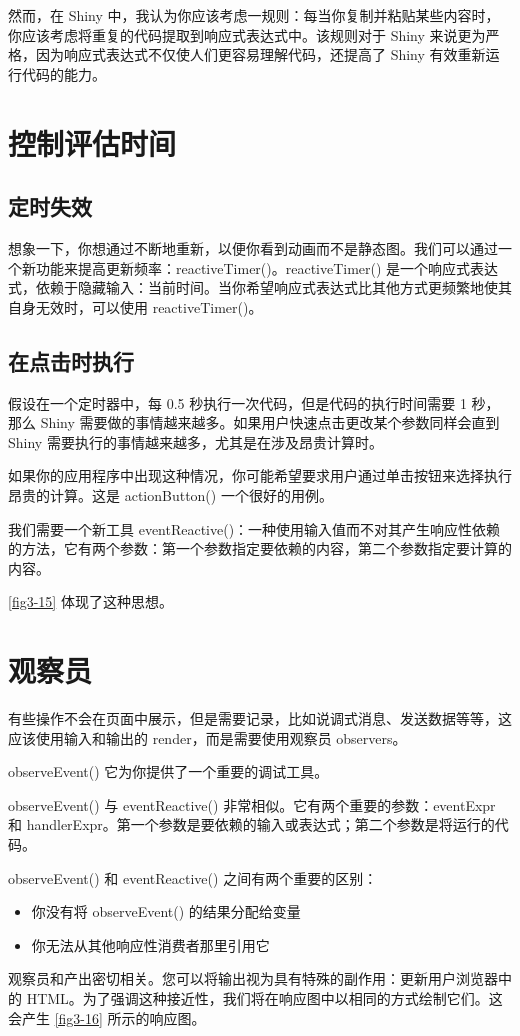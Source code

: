 然而，在 Shiny 中，我认为你应该考虑一规则：每当你复制并粘贴某些内容时，你应该考虑将重复的代码提取到响应式表达式中。该规则对于 Shiny 来说更为严格，因为响应式表达式不仅使人们更容易理解代码，还提高了 Shiny 有效重新运行代码的能力。
\section{控制评估时间}
\subsection{定时失效}
想象一下，你想通过不断地重新，以便你看到动画而不是静态图。我们可以通过一个新功能来提高更新频率：reactiveTimer()。reactiveTimer() 是一个响应式表达式，依赖于隐藏输入：当前时间。当你希望响应式表达式比其他方式更频繁地使其自身无效时，可以使用 reactiveTimer()。
\subsection{在点击时执行}
假设在一个定时器中，每 0.5 秒执行一次代码，但是代码的执行时间需要 1 秒，那么 Shiny 需要做的事情越来越多。如果用户快速点击更改某个参数同样会直到 Shiny 需要执行的事情越来越多，尤其是在涉及昂贵计算时。

如果你的应用程序中出现这种情况，你可能希望要求用户通过单击按钮来选择执行昂贵的计算。这是 actionButton() 一个很好的用例。

我们需要一个新工具 eventReactive()：一种使用输入值而不对其产生响应性依赖的方法，它有两个参数：第一个参数指定要依赖的内容，第二个参数指定要计算的内容。

\autoref{fig3-15} 体现了这种思想。
\section{观察员}
有些操作不会在页面中展示，但是需要记录，比如说调式消息、发送数据等等，这应该使用输入和输出的 render，而是需要使用观察员 observers。

observeEvent() 它为你提供了一个重要的调试工具。

observeEvent() 与 eventReactive() 非常相似。它有两个重要的参数：eventExpr 和 handlerExpr。第一个参数是要依赖的输入或表达式；第二个参数是将运行的代码。

observeEvent() 和 eventReactive() 之间有两个重要的区别：
\begin{itemize}
    \item 你没有将 observeEvent() 的结果分配给变量
    \item 你无法从其他响应性消费者那里引用它
\end{itemize}

观察员和产出密切相关。您可以将输出视为具有特殊的副作用：更新用户浏览器中的 HTML。为了强调这种接近性，我们将在响应图中以相同的方式绘制它们。这会产生 \autoref{fig3-16} 所示的响应图。